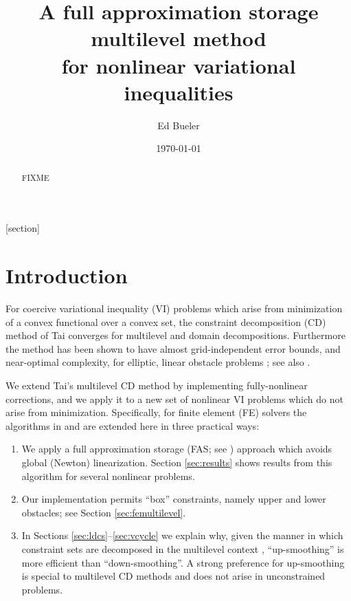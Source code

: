 \documentclass[letterpaper,final,12pt,reqno]{amsart}
\theoremstyle{cstyle}
\theoremstyle{cstyle*}
\theoremstyle{dstyle}
\numberwithin{equation}{section}
\numberwithin{figure}{section}
\numberwithin{table}{section}
\numberwithin{theorem}{section}
\begin{document}
\title[FAS for nonlinear variational inequalities]{A full approximation storage multilevel method \\ for nonlinear variational inequalities}

\author{Ed Bueler}

\date{\today}

\begin{abstract} FIXME
\end{abstract}

\maketitle

\tableofcontents

\thispagestyle{empty}

[section]


\section{Introduction} \label{sec:intro}

For coercive variational inequality (VI) problems which arise from minimization of a convex functional over a convex set, the constraint decomposition (CD) method of Tai \cite{Tai2003} converges for multilevel and domain decompositions.  Furthermore the method has been shown to have almost grid-independent error bounds, and near-optimal complexity, for elliptic, linear obstacle problems \cite[Subsection 5.4]{Tai2003}; see also \cite[Theorem 4.6 and Algorithm 4.7]{GraeserKornhuber2009}.

We extend Tai's multilevel CD method by implementing fully-nonlinear corrections, and we apply it to a new set of nonlinear VI problems which do not arise from minimization.  Specifically, for finite element (FE) solvers the algorithms in \cite{GraeserKornhuber2009} and \cite{Tai2003} are extended here in three practical ways:
\renewcommand{\labelenumi}{\emph{(\roman{enumi})}}
\begin{enumerate}
\item We apply a full approximation storage (FAS; see \cite{Brandt1977,Bruneetal2015}) approach which avoids global (Newton) linearization.  Section \ref{sec:results} shows results from this  algorithm for several nonlinear problems.
\item Our  implementation permits ``box'' constraints, namely upper and lower obstacles; see Section \ref{sec:femultilevel}.
\item In Sections \ref{sec:ldcs}--\ref{sec:vcycle} we explain why, given the manner in which constraint sets are decomposed in the multilevel context \cite{GraeserKornhuber2009}, ``up-smoothing'' is more efficient than ``down-smoothing''.  A strong preference for up-smoothing is special to multilevel CD methods and does not arise in unconstrained problems.
\end{enumerate}
\end{document}
